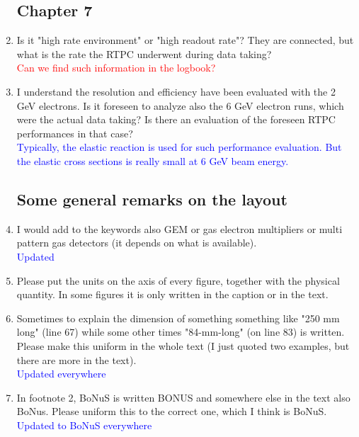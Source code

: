 \documentclass[a4paper,11pt,twoside]{article}
\begin{document}
\begin{enumerate}
\subsection*{ Chapter 7} 

\item Is it "high rate environment" or "high readout rate"? They are connected, 
   but what is the rate the RTPC underwent during data taking?\\
\textcolor{red}{Can we find such information in the logbook?} 

\item I understand the resolution and efficiency have been evaluated with the 2 
   GeV electrons. Is it foreseen to analyze also the 6 GeV electron runs, which 
   were the actual data taking? Is there an evaluation of the foreseen RTPC 
   performances in that case?\\
\textcolor{blue}{Typically, the elastic reaction is used for such performance 
evaluation. But the elastic cross sections is really small at 6 GeV beam 
energy.} 

\subsection*{ Some general remarks on the layout}

\item I would add to the keywords also GEM or gas electron multipliers or multi 
   pattern gas detectors (it depends on what is available).\\
\textcolor{blue}{Updated} 

\item Please put the units on the axis of every figure, together with the 
   physical quantity. In some figures it is only written in the caption or in 
   the text.\\
\textcolor{blue}{ } 

\item Sometimes to explain the dimension of something something like "250 mm 
   long" (line 67) while some other times "84-mm-long" (on line 83) is written. 
   Please make this uniform in the whole text (I just quoted two examples, but 
   there are more in the text).\\
\textcolor{blue}{Updated everywhere} 

\item In footnote 2, BoNuS is written BONUS and somewhere else in the text also 
   BoNus. Please uniform this to the correct one, which I think is BoNuS.\\
\textcolor{blue}{Updated to BoNuS everywhere} 


\end{enumerate}
\end{document}
